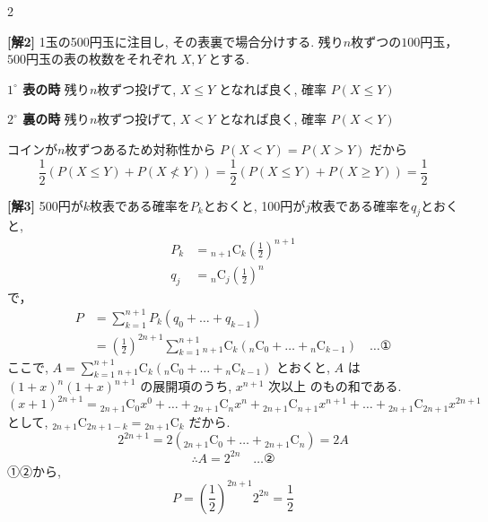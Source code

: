 \documentclass[../../../../main.tex]{subfiles}
\begin{document}
\begin{multicols}{2}
\begin{figure}[H]
  \end{figure}



  \textbf{[解2]}
  1玉の500円玉に注目し, その表裏で場合分けする.
  残り$n$枚ずつの$100$円玉，$500$円玉の表の枚数をそれぞれ $X, Y$ とする.

  \textbf{$1^\circ$ 表の時}
  残り$n$枚ずつ投げて, $X \le Y$ となれば良く, 確率 $P(X \le Y)$

  \textbf{$2^\circ$ 裏の時}
  残り$n$枚ずつ投げて, $X < Y$ となれば良く, 確率 $P(X < Y)$

  コインが$n$枚ずつあるため対称性から $P(X < Y) = P(X > Y)$ だから
  \[ \frac{1}{2} \left( P(X \le Y) + P(X \not< Y) \right) = \frac{1}{2} \left( P(X \le Y) + P(X \ge Y) \right) = \frac{1}{2} \]


  \textbf{[解3]}
  500円が$k$枚表である確率を$P_k$とおくと,
  100円が$j$枚表である確率を$q_j$とおくと,
  \begin{align*}
    P_k & = {}_{n+1}\mathrm{C}_k \left(\frac{1}{2}\right)^{n+1} \\
    q_j & = {}_{n}\mathrm{C}_j \left(\frac{1}{2}\right)^{n}
  \end{align*}
  で，
  \begin{align*}
    P & = \sum_{k=1}^{n+1} P_k (q_0 + \dots + q_{k-1})                                                                                                 \\
      & = \left(\frac{1}{2}\right)^{2n+1} \sum_{k=1}^{n+1} {}_{n+1}\mathrm{C}_k ({}_n\mathrm{C}_0 + \dots + {}_n\mathrm{C}_{k-1}) \quad \dots \text{①}
  \end{align*}
  ここで, $A = \sum_{k=1}^{n+1} {}_{n+1}\mathrm{C}_k ({}_n\mathrm{C}_0 + \dots + {}_n\mathrm{C}_{k-1})$ とおくと, $A$ は $(1+x)^n (1+x)^{n+1}$ の展開項のうち, $x^{n+1}$ 次以上
  のもの和である.
  \[ (x+1)^{2n+1} = {}_{2n+1}\mathrm{C}_0 x^0 + \dots + {}_{2n+1}\mathrm{C}_n x^n + {}_{2n+1}\mathrm{C}_{n+1} x^{n+1} + \dots + {}_{2n+1}\mathrm{C}_{2n+1} x^{2n+1} \]
  として, ${}_{2n+1}\mathrm{C}_{2n+1-k} = {}_{2n+1}\mathrm{C}_k$ だから.
  \[ 2^{2n+1} = 2 \left( {}_{2n+1}\mathrm{C}_0 + \dots + {}_{2n+1}\mathrm{C}_n \right) = 2A \]
  \[ \therefore A = 2^{2n} \quad \dots \text{②} \]
  ①②から,
  \[ P = \left(\frac{1}{2}\right)^{2n+1} 2^{2n} = \frac{1}{2} \]


\end{multicols}
\end{document}
